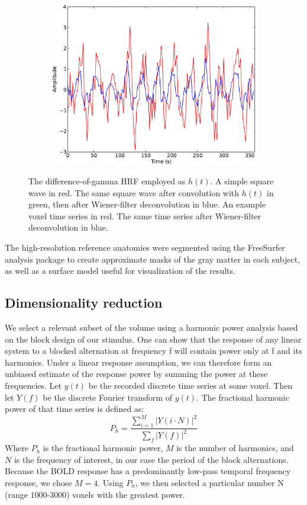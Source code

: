 \documentclass[preprint,5p,authoryear]{elsarticle}
\begin{document}
\begin{figure}
\begin{subfigure}{0.45\textwidth}
\includegraphics[width=\textwidth]{figures/voxel-wiener-deconvolution-plot}
\caption{}
\label{fig:wiener-voxel}
\end{subfigure}
\caption{
 The difference-of-gamma HRF employed as $h(t)$. 
 A simple square wave in red. 
The same square wave after convolution with $h(t)$ in green, then after Wiener-filter deconvolution in blue. 
 An example voxel time series in red. 
The same time series after Wiener-filter deconvolution in blue.}
\label{fig:wiener-deconvolution}
\end{figure}

The high-resolution reference anatomies were segmented using the FreeSurfer analysis package \citep{FreeSurfer} to create approximate masks of the gray matter in each subject, as well as a surface model useful for visualization of the results.

\subsection{Dimensionality reduction}
We select a relevant subset of the volume using a harmonic power analysis based on the block design of our stimulus. 
One can show that the response of any linear system to a blocked alternation at frequency f will contain power only at f and its harmonics. 
Under a linear response assumption, we can therefore form an unbiased estimate of the response power by summing the power at these frequencies. 
Let $y(t)$ be the recorded discrete time series at some voxel.
Then let $Y(f)$ be the discrete Fourier transform of $y(t)$.
The fractional harmonic power of that time series is defined as:
\begin{equation}
P_h = \frac{\sum_{i = 1}^{M}{\left|Y(i \cdot N)\right|^{2}}}{\sum_{f}{\left|Y(f)\right|^{2}}}
\end{equation}
Where $P_h$ is the fractional harmonic power, $M$ is the number of harmonics, and $N$ is the frequency of interest, in our case the period of the block alternations. 
Because the BOLD response has a predominantly low-pass temporal frequency response, we chose $M = 4$. 
Using $P_h$, we then selected a particular number N (range 1000-3000) voxels with the greatest power. 
\end{document}
